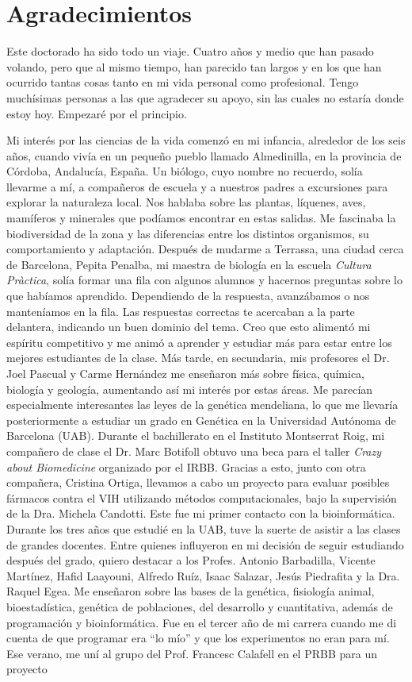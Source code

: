 \chapter*{Agradecimientos} %

Este doctorado ha sido todo un viaje. Cuatro años y medio que han pasado volando, pero que al mismo tiempo, han parecido tan largos y en los que han ocurrido tantas cosas tanto en mi vida personal como profesional. Tengo muchísimas personas a las que agradecer su apoyo, sin las cuales no estaría donde estoy hoy. Empezaré por el principio.

Mi interés por las ciencias de la vida comenzó en mi infancia, alrededor de los seis años, cuando vivía en un pequeño pueblo llamado Almedinilla, en la provincia de Córdoba, Andalucía, España. Un biólogo, cuyo nombre no recuerdo, solía llevarme a mí, a compañeros de escuela y a nuestros padres a excursiones para explorar la naturaleza local. Nos hablaba sobre las plantas, líquenes, aves, mamíferos y minerales que podíamos encontrar en estas salidas. Me fascinaba la biodiversidad de la zona y las diferencias entre los distintos organismos, su comportamiento y adaptación. Después de mudarme a Terrassa, una ciudad cerca de Barcelona, Pepita Penalba, mi maestra de biología en la escuela \textit{Cultura Pràctica}, solía formar una fila con algunos alumnos y hacernos preguntas sobre lo que habíamos aprendido. Dependiendo de la respuesta, avanzábamos o nos manteníamos en la fila. Las respuestas correctas te acercaban a la parte delantera, indicando un buen dominio del tema. Creo que esto alimentó mi espíritu competitivo y me animó a aprender y estudiar más para estar entre los mejores estudiantes de la clase. Más tarde, en secundaria, mis profesores el Dr. Joel Pascual y Carme Hernández me enseñaron más sobre física, química, biología y geología, aumentando así mi interés por estas áreas. Me parecían especialmente interesantes las leyes de la genética mendeliana, lo que me llevaría posteriormente a estudiar un grado en Genética en la Universidad Autónoma de Barcelona (UAB). Durante el bachillerato en el Instituto Montserrat Roig, mi compañero de clase el Dr. Marc Botifoll obtuvo una beca para el taller \textit{Crazy about Biomedicine} organizado por el IRBB. Gracias a esto, junto con otra compañera, Cristina Ortiga, llevamos a cabo un proyecto para evaluar posibles fármacos contra el VIH utilizando métodos computacionales, bajo la supervisión de la Dra. Michela Candotti. Este fue mi primer contacto con la bioinformática. Durante los tres años que estudié en la UAB, tuve la suerte de asistir a las clases de grandes docentes. Entre quienes influyeron en mi decisión de seguir estudiando después del grado, quiero destacar a los Profes. Antonio Barbadilla, Vicente Martínez, Hafid Laayouni, Alfredo Ruíz, Isaac Salazar, Jesús Piedrafita y la Dra. Raquel Egea. Me enseñaron sobre las bases de la genética, fisiología animal, bioestadística, genética de poblaciones, del desarrollo y cuantitativa, además de programación y bioinformática. Fue en el tercer año de mi carrera cuando me di cuenta de que programar era ``lo mío'' y que los experimentos no eran para mí. Ese verano, me uní al grupo del Prof. Francesc Calafell en el PRBB para un proyecto 
